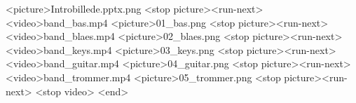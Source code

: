 <picture>Introbillede.pptx.png
<stop picture><run-next>
<video>band_bas.mp4
<picture>01_bas.png
<stop picture><run-next>
<video>band_blaes.mp4
<picture>02_blaes.png
<stop picture><run-next>
<video>band_keys.mp4
<picture>03_keys.png
<stop picture><run-next>
<video>band_guitar.mp4
<picture>04_guitar.png
<stop picture><run-next>
<video>band_trommer.mp4
<picture>05_trommer.png
<stop picture><run-next>
<stop video>
<end>
